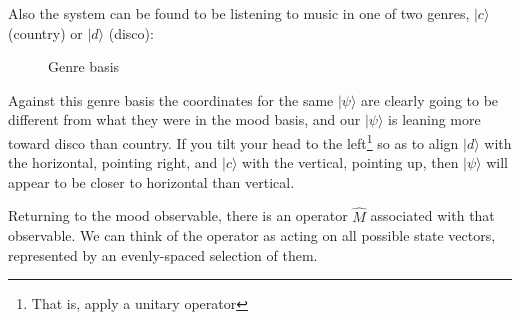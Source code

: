 Also the system can be found to be listening to music in one of two genres, $|c\rangle$ (country) or $|d\rangle$ (disco):

\begin{figure}[h]
  \centering
  \centering
  \caption{Genre basis} \label{fig:genre-basis}
\end{figure}

Against this genre basis the coordinates for the same $|\psi\rangle$ are clearly going to be different from what they were in the mood basis, and our $|\psi\rangle$ is leaning more toward disco than country. If you tilt your head to the left\footnote{That is, apply a unitary operator} so as to align $|d\rangle$ with the horizontal, pointing right, and $|c\rangle$ with the vertical, pointing up, then $|\psi\rangle$ will appear to be closer to horizontal than vertical.

Returning to the mood observable, there is an operator $\hat{M}$ associated with that observable. We can think of the operator as acting on all possible state vectors, represented by an evenly-spaced selection of them.

